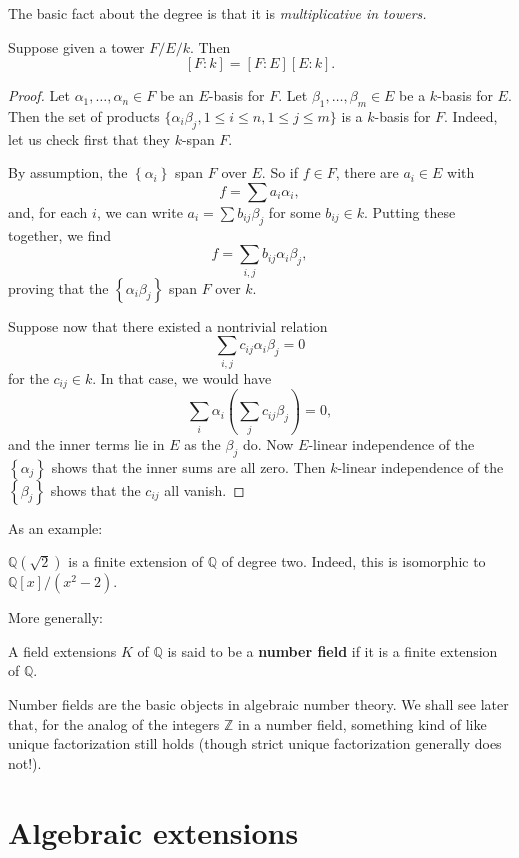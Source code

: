 The basic fact about the degree is that it is \emph{multiplicative in
towers.}

\begin{proposition} 
Suppose given a tower $F/E/k$. Then
\[ [F:k] = [F:E][E:k].  \]
\end{proposition} 
\begin{proof} 
Let $\alpha_1, \dots, \alpha_n \in F$ be an $E$-basis for $F$. Let $\beta_1,
\dots, \beta_m \in E$ be a $k$-basis for $E$. Then 
the set of products $\{\alpha_i \beta_j, 1 \leq i \leq n, 1 \leq j \leq m\}$ is a $k$-basis for $F$. 
Indeed, let us check first that they $k$-span $F$.

By assumption, the $\left\{\alpha_i\right\}$ span $F$ over $E$. So if $f \in
F$, there are $a_i \in E$ with 
\[ f = \sum a_i\alpha_i,  \]
and, for each $i$, we can write $a_i = \sum b_{ij} \beta_j$ for some $b_{ij} \in k$. Putting
these together, we find
\[ f = \sum_{i,j} b_{ij}\alpha_i \beta_j,  \]
proving that the $\left\{\alpha_i \beta_j\right\}$ span $F$ over $k$.

Suppose now that there existed a nontrivial relation
\[ \sum_{i,j} c_{ij} \alpha_i \beta_j =0 \]
for the $c_{ij} \in k$. In that case, we would have
\[ \sum_i \alpha_i \left( \sum_j c_{ij} \beta_j \right) =0, \]
and the inner terms lie in $E$ as the $\beta_j$ do. Now $E$-linear independence of
the $\left\{\alpha_j\right\}$ shows that the inner sums are all zero. Then
$k$-linear independence of the $\left\{\beta_j\right\}$ shows that the
$c_{ij}$ all vanish.
\end{proof} 

As an example:
\begin{example} 
$\mathbb{Q}(\sqrt{2})$ is a finite extension of $\mathbb{Q}$ of degree two.
Indeed, this is isomorphic to $\mathbb{Q}[x]/(x^2-2)$.
\end{example} 

More generally:
\begin{definition} 
 A field extensions $K$ of $\mathbb{Q}$ is said to be a \textbf{number field}
if it is a finite extension of $\mathbb{Q}$.
\end{definition} 
Number fields are the basic objects in algebraic number theory. We shall see
later that,
for the analog of the integers $\mathbb{Z}$ in a number field, something kind
of like unique factorization still holds (though strict unique factorization
generally does not!).

\section{Algebraic extensions}
